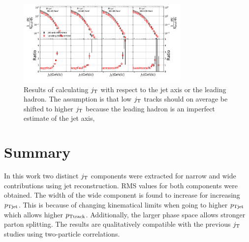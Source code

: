 \begin{figure}[htp]
\centering
\includegraphics[width=0.75\textwidth]{figures/results/MixedFullJetsR04JetConeJtLeadingRefPtFrom2To6}
\caption{Results of calculating $j_{\rm T}$ with respect to the jet axis or the leading hadron. The assumption is that low $j_{\rm T}$ tracks should on average be shifted to higher $j_{\rm T}$ because the leading hadron is an imperfect estimate of the jet axis,}
\label{fig:RefComparison}
\end{figure}

\section{Summary}
\label{sec:summary}
In this work two distinct $j_{\rm T}$ components were extracted for narrow and wide contributions using jet reconstruction. RMS values for both components were obtained. The width of the wide component is found to increase for increasing $p_{\rm Tjet}$. This is because of changing kinematical limits when going to higher $p_{\rm Tjet}$ which allows higher $p_{\rm Ttrack}$. Additionally, the larger phase space allows stronger parton splitting. The results are qualitatively compatible with the previous $j_{\rm T}$ studies using two-particle correlations.
